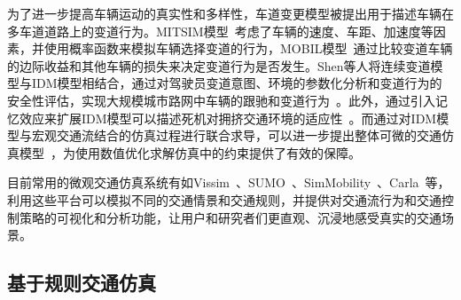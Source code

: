 为了进一步提高车辆运动的真实性和多样性，车道变更模型被提出用于描述车辆在多车道道路上的变道行为。MITSIM模型~\cite{yang1996mitsim}考虑了车辆的速度、车距、加速度等因素，并使用概率函数来模拟车辆选择变道的行为，MOBIL模型~\cite{kesting2007general}通过比较变道车辆的边际收益和其他车辆的损失来决定变道行为是否发生。Shen等人将连续变道模型与IDM模型相结合，通过对驾驶员变道意图、环境的参数化分析和变道行为的安全性评估，实现大规模城市路网中车辆的跟驰和变道行为~\cite{shen2012detailed}。此外，通过引入记忆效应来扩展IDM模型可以描述死机对拥挤交通环境的适应性~\cite{treiber2003memory}。而通过对IDM模型与宏观交通流结合的仿真过程进行联合求导，可以进一步提出整体可微的交通仿真模型~\cite{son2022differentiable}，为使用数值优化求解仿真中的约束提供了有效的保障。



目前常用的微观交通仿真系统有如Vissim~\cite{fellendorf1994vissim}、SUMO~\cite{krajzewicz2002sumo}、SimMobility~\cite{adnan2016simmobility}、Carla~\cite{dosovitskiy2017carla}等，利用这些平台可以模拟不同的交通情景和交通规则，并提供对交通流行为和交通控制策略的可视化和分析功能，让用户和研究者们更直观、沉浸地感受真实的交通场景。









\subsection{基于规则交通仿真}

